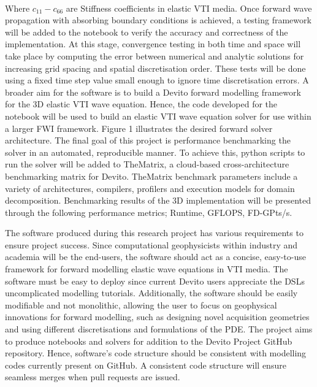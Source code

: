 \\
Where $c_{11}-c_{66}$ are Stiffness coefficients in elastic VTI media.
Once forward wave propagation with absorbing boundary conditions is achieved, a testing framework will be added to the notebook to verify the accuracy and correctness of the implementation. At this stage, convergence testing in both time and space will take place by computing the error between numerical and analytic solutions for increasing grid spacing and spatial discretisation order. These tests will be done using a fixed time step value small enough to ignore time discretisation errors. 
A broader aim for the software is to build a Devito forward modelling framework for the 3D elastic VTI wave equation. Hence, the code developed for the notebook will be used to build an elastic VTI wave equation solver for use within a larger FWI framework. Figure 1 illustrates the desired forward solver architecture. The final goal of this project is performance benchmarking the solver in an automated, reproducible manner. To achieve this, python scripts to run the solver will be added to TheMatrix, a cloud-based cross-architecture benchmarking matrix for Devito. TheMatrix benchmark parameters include a variety of architectures, compilers, profilers and execution models for domain decomposition. Benchmarking results of the 3D implementation will be presented through the following performance metrics; Runtime, GFLOPS, FD-GPts/s. \\ 
\newpage

The software produced during this research project has various requirements to ensure project success. Since computational geophysicists within industry and academia will be the end-users, the software should act as a concise, easy-to-use framework for forward modelling elastic wave equations in VTI media. The software must be easy to deploy since current Devito users appreciate the DSLs uncomplicated modelling tutorials. Additionally, the software should be easily modifiable and not monolithic, allowing the user to focus on geophysical innovations for forward modelling, such as designing novel acquisition geometries and using different discretisations and formulations of the PDE. The project aims to produce notebooks and solvers for addition to the Devito Project GitHub repository. Hence, software's code structure should be consistent with modelling codes currently present on GitHub. A consistent code structure will ensure seamless merges when pull requests are issued.\\

